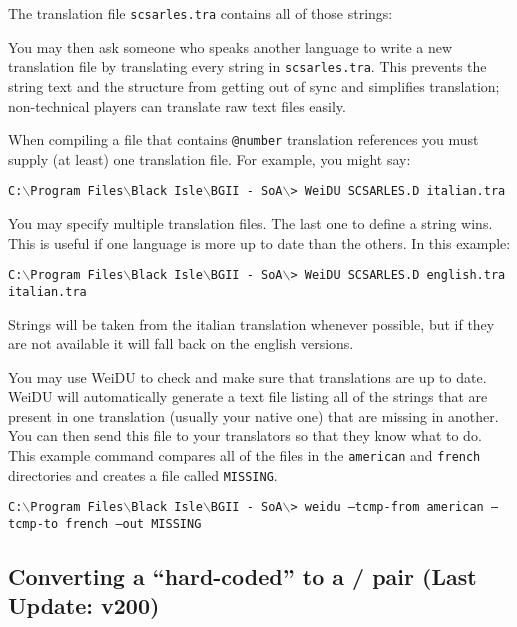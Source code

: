 \documentclass{article}
\def\ttref#1{\ahrefloc{#1}{\tt #1}}
\def\t#1{{\tt #1}}
\def\CMD#1{{\tt {C:$\backslash$Program Files$\backslash$Black Isle$\backslash$BGII - SoA$\backslash$>} \color{red} \t{#1} }}
\begin{document}
The translation file \t{scsarles.tra} contains all of those strings: 
You may then ask someone who speaks another language to write a new
translation file by translating every string in \t{scsarles.tra}. This
prevents the string text and the structure from getting out of sync
and simplifies translation; non-technical players can translate raw text
files easily. 

When compiling a \ttref{D} file that contains \t{@number} translation
references you must supply (at least) one translation file. For example,
you might say:

\CMD{WeiDU SCSARLES.D italian.tra}

You may specify multiple translation files. The last one to define a string
wins. This is useful if one language is more up to date than the others. In
this example:

\CMD{WeiDU SCSARLES.D english.tra italian.tra}

Strings will be taken from the italian translation whenever possible, but
if they are not available it will fall back on the english versions.

You may use WeiDU to check and make sure that translations are up to date.
WeiDU will automatically generate a text file listing all of the strings
that are present in one translation (usually your native one) that are
missing in another. You can then send this file to your translators so that
they know what to do. This example command compares all of the \ttref{TRA}
files in the \t{american} and \t{french} directories and creates a file
called \t{MISSING}. 

\CMD{weidu --tcmp-from american --tcmp-to french --out MISSING}

\subsection{Converting a ``hard-coded'' \ttref{D} to a \ttref{D}/\ttref{TRA} pair (Last Update: v200)}
\end{document}
